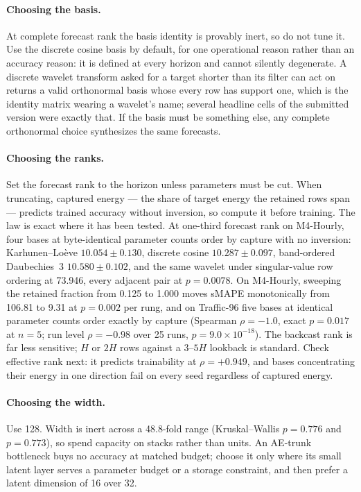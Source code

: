 \paragraph{Choosing the basis.}
At complete forecast rank the basis identity is provably inert, so do
not tune it. Use the discrete cosine basis by default, for one
operational reason rather than an accuracy reason: it is defined at
every horizon and cannot silently degenerate. A discrete wavelet
transform asked for a target shorter than its filter can act on returns
a valid orthonormal basis whose every row has support one, which is the
identity matrix wearing a wavelet's name; several headline cells of the
submitted version were exactly that. If the basis must be something else,
any complete orthonormal choice synthesizes the same forecasts.

\paragraph{Choosing the ranks.}
Set the forecast rank to the horizon unless parameters must be cut. When
truncating, captured energy --- the share of target energy the retained
rows span --- predicts trained accuracy without inversion, so compute it
before training. The law is exact where it has been tested. At
one-third forecast rank on M4-Hourly, four bases at byte-identical
parameter counts order by capture with no inversion: Karhunen--Lo\`eve
$10.054 \pm 0.130$, discrete cosine $10.287 \pm 0.097$, band-ordered
Daubechies~3 $10.580 \pm 0.102$, and the same wavelet under
singular-value row ordering at 73.946, every adjacent pair at
$p = 0.0078$. On M4-Hourly, sweeping the retained fraction from 0.125
to 1.000 moves sMAPE monotonically from 106.81 to 9.31 at $p = 0.002$
per rung, and on Traffic-96 five bases at identical parameter counts
order exactly by capture (Spearman $\rho = -1.0$, exact $p = 0.017$ at
$n = 5$; run level $\rho = -0.98$ over 25 runs, $p = 9.0 \times
10^{-18}$). The backcast rank is far less sensitive; $H$ or $2H$ rows
against a $3$--$5H$ lookback is standard. Check effective rank next: it
predicts trainability at $\rho = +0.949$, and bases concentrating their
energy in one direction fail on every seed regardless of captured
energy.

\paragraph{Choosing the width.}
Use 128. Width is inert across a 48.8-fold range (Kruskal--Wallis
$p = 0.776$ and $p = 0.773$), so spend capacity on stacks rather than
units. An AE-trunk bottleneck buys no accuracy at matched budget; choose
it only where its small latent layer serves a parameter budget or a
storage constraint, and then prefer a latent dimension of 16 over 32.

